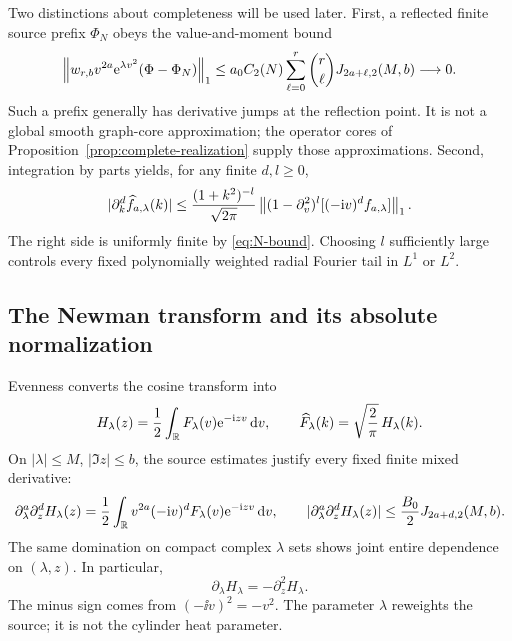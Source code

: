Two distinctions about completeness will be used later. First, a
reflected finite source prefix $\Phi_N$ obeys the value-and-moment bound
\begin{equation}
 \left\lVert w_{r,b}v^{2a}\mathrm e^{\lambda v^2}(\Phi-\Phi_N)\right\rVert_1
 \le a_0C_2(N)\sum_{\ell=0}^r\binom r\ell
                      J_{2a+\ell,2}(M,b)\longrightarrow0.
 \label{eq:prefix-value-tail}
\end{equation}
Such a prefix generally has derivative jumps at the reflection point.
It is not a global smooth graph-core approximation; the operator cores
of Proposition~\ref{prop:complete-realization} supply those approximations.
Second, integration by parts yields, for any finite $d,l\ge0$,
\begin{equation}
 |\partial_k^d\widehat f_{a,\lambda}(k)|
 \le\frac{(1+k^2)^{-l}}{\sqrt{2\pi}}
 \left\lVert(1-\partial_v^2)^l[(-\mathrm i v)^df_{a,\lambda}]\right\rVert_1.
 \label{eq:fourier-tail}
\end{equation}
The right side is uniformly finite by \eqref{eq:N-bound}. Choosing $l$
sufficiently large controls every fixed polynomially weighted radial
Fourier tail in $L^1$ or $L^2$.

\subsection{The Newman transform and its absolute normalization}

Evenness converts the cosine transform into
\begin{equation}
 H_\lambda(z)=\frac12\int_\mathbb R F_\lambda(v)\mathrm e^{-\mathrm i zv}\,\mathrm d v,
 \qquad \widehat F_\lambda(k)=\sqrt{\frac2\pi}\,H_\lambda(k).
 \label{eq:H-fourier}
\end{equation}
On $|\lambda|\le M$, $|\Im z|\le b$, the source estimates justify
every fixed finite mixed derivative:
\begin{equation}
 \partial_\lambda^a\partial_z^d H_\lambda(z)
 =\frac12\int_\mathbb R v^{2a}(-\mathrm i v)^dF_\lambda(v)
                   \mathrm e^{-\mathrm i zv}\,\mathrm d v,
 \qquad
 |\partial_\lambda^a\partial_z^d H_\lambda(z)|
 \le\frac{B_0}{2}J_{2a+d,2}(M,b).
 \label{eq:H-derivatives}
\end{equation}
The same domination on compact complex $\lambda$ sets shows joint
entire dependence on $(\lambda,z)$. In particular,
\begin{equation}
 \partial_\lambda H_\lambda=-\partial_z^2H_\lambda.
 \label{eq:newman-heat}
\end{equation}
The minus sign comes from $(-\ii v)^2=-v^2$. The parameter $\lambda$
reweights the source; it is not the cylinder heat parameter.

